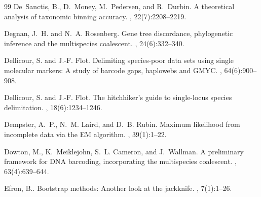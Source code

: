 \documentclass[12pt]{article}
\begin{document}
\begin{thebibliography}{99}
De~Sanctis, B., D.~Money, M.~Pedersen, and
  R.~Durbin\leavevmode\nopagebreak{}.
\newblock A theoretical analysis of taxonomic binning accuracy.
, 22(7):2208--2219.

Degnan, J.~H. and N.~A. Rosenberg\leavevmode\nopagebreak{}.
\newblock Gene tree discordance, phylogenetic inference and the multispecies
  coalescent.
, 24(6):332--340.

Dellicour, S. and J.-F. Flot\leavevmode\nopagebreak{}.
\newblock Delimiting species-poor data sets using single molecular markers: {A}
  study of barcode gaps, haplowebs and {GMYC}.
, 64(6):900--908.

Dellicour, S. and J.-F. Flot\leavevmode\nopagebreak{}.
\newblock The hitchhiker's guide to single-locus species delimitation.
, 18(6):1234--1246.

Dempster, A.~P., N.~M. Laird, and D.~B. Rubin\leavevmode\nopagebreak{}.
\newblock Maximum likelihood from incomplete data via the {EM} algorithm.
, 39(1):1--22.

Dowton, M., K.~Meiklejohn, S.~L. Cameron, and
  J.~Wallman\leavevmode\nopagebreak{}.
\newblock A preliminary framework for {DNA} barcoding, incorporating the
  multispecies coalescent.
, 63(4):639--644.

Efron, B.\leavevmode\nopagebreak{}.
\newblock Bootstrap methods: Another look at the jackknife.
, 7(1):1--26.


\end{thebibliography}
\end{document}
